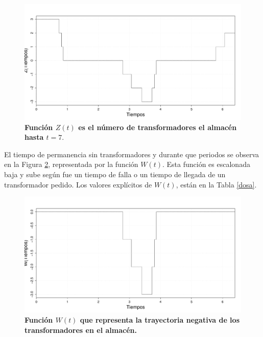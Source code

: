 \begin{figure}[h!]
\begin{center}
\includegraphics[scale=.3]{ejeu2.pdf}
\end{center}
\vspace{-1 cm} \caption{\bf Funci\'on $Z(t)$ es el n\'umero de transformadores el almac\'en hasta $t=7.$}\label{ejeu2}
\end{figure}

\noindent El tiempo de permanencia sin transformadores y durante que periodos se observa en la Figura \ref{ejeu3},  representada por la funci\'on $W(t)$. Esta funci\'on es escalonada baja y sube seg\'un fue un tiempo de falla o un tiempo de llegada de un transformador pedido. Los valores expl\'icitos de $W(t)$, est\'an en la Tabla \ref{dosa}.

 
 
 \begin{figure}[h!]
\begin{center}
\includegraphics[scale=.3]{ejeu3.pdf}
\end{center}
\vspace{-1 cm}\caption{\bf Funci\'on $W(t)$ que representa la trayectoria negativa de los transformadores en el almac\'en.}\label{ejeu3}
\end{figure}


